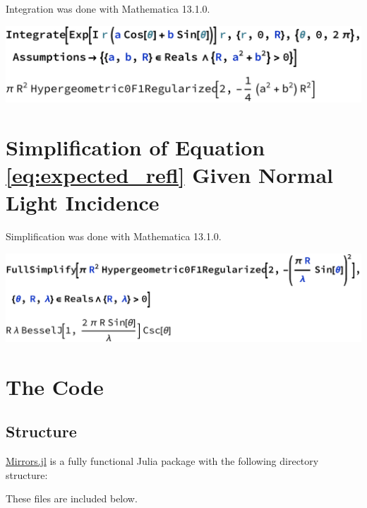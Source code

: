\documentclass[etd,senior,noacknowledgments]{BYUPhys}
\begin{document}
\begin{appendices}
  Integration was done with Mathematica 13.1.0.
  
  \includegraphics[width=\textwidth]{nasty-integral.pdf}
  
  
  
  \chapter{Simplification of Equation \ref{eq:expected_refl} Given Normal Light Incidence}\label{chap:airy_validation}
  
  Simplification was done with Mathematica 13.1.0.
  
  \includegraphics[width=\textwidth]{airy-simplification.pdf}
  
  
  
  \chapter{The Code}\label{chap:julia}
  
  \section{Structure}
  
  \href{https://github.com/mjg0/Mirrors.jl}{Mirrors.jl} is a fully functional Julia package with the following directory structure:
  
  
  
  These files are included below.
  
  \begin{tiny}
    
  \end{tiny}
  
\end{appendices}






\printindex
\end{document}
